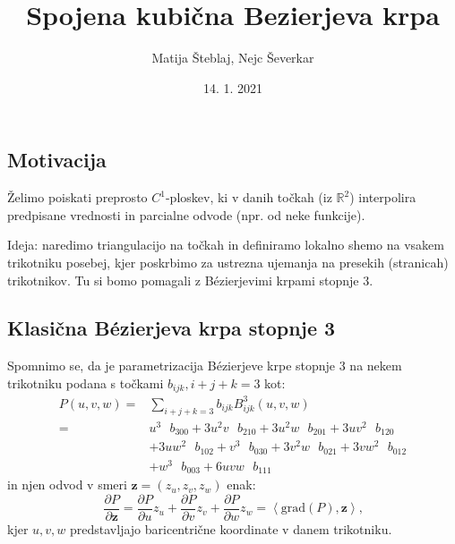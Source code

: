 \documentclass[ignorenonframetext]{beamer}
\title{Spojena kubična Bezierjeva krpa}
\author{Matija Šteblaj, Nejc Ševerkar}
\date{14. 1. 2021}
\newcommand{\scalar}[1]{\left\langle#1\right\rangle}
\let\frametitle\subsection %
\begin{document}
\begin{frame}
\titlepage
\end{frame}

\begin{frame}
\frametitle{Motivacija}
Želimo poiskati preprosto $C^1$-ploskev, ki v danih točkah (iz $\mathbb{R}^2$) interpolira predpisane vrednosti in parcialne odvode (npr. od neke funkcije).\vspace{10px}

Ideja: naredimo triangulacijo na točkah in definiramo lokalno shemo na vsakem trikotniku posebej, kjer poskrbimo za ustrezna ujemanja na presekih (stranicah) trikotnikov. Tu si bomo pomagali z Bézierjevimi krpami stopnje 3.
\end{frame}


\begin{frame}
\frametitle{Klasična  Bézierjeva krpa stopnje 3}
Spomnimo se, da je parametrizacija  Bézierjeve krpe stopnje 3 na nekem trikotniku podana s točkami $b_{ijk}, i+j+k=3$ kot:
\[
\begin{split}
	P(u,v,w) =& \sum_{i+j+k=3} b_{ijk} B_{ijk}^3(u,v,w) \\
		=& u^3 \text{ }b_{300} + 3u^2 v \text{ }b_{210} + 3u^2 w \text{ }b_{201} + 3u v^2 \text{ }b_{120} \\
		&+ 3uw^2 \text{ }b_{102} + v^3 \text{ }b_{030} + 3v^2 w \text{ }b_{021} + 3v w^2 \text{ }b_{012} \\
		&+ w^3 \text{ }b_{003} + 6uvw \text{ }b_{111}
\end{split}
\]
in njen odvod v smeri $\textbf{z} = (z_u,z_v,z_w)$ enak:
$$\frac{\partial{P}}{\partial{\textbf{z}}} = \frac{\partial{P}}{\partial{u}} z_u+ \frac{\partial{P}}{\partial{v}} z_v+ \frac{\partial{P}}{\partial{w}} z_w = \scalar{\text{grad}(P), \textbf{z}}\text{,}$$
kjer $u,v,w$ predstavljajo baricentrične koordinate v danem trikotniku.
\end{frame}
\end{document}
